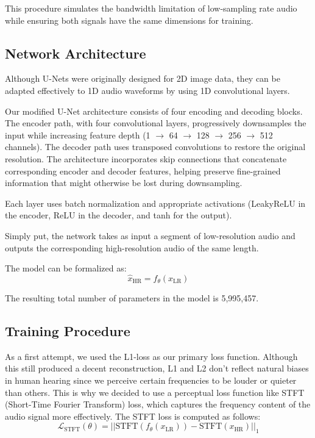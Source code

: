 \documentclass{article}
\begin{document}
This procedure simulates the bandwidth limitation of low-sampling rate audio while ensuring both signals have the same dimensions for training.

\subsection{Network Architecture}
Although U-Nets were originally designed for 2D image data, they can be adapted effectively to 1D audio waveforms by using 1D convolutional layers.

Our modified U-Net architecture consists of four encoding and decoding blocks.
The encoder path, with four convolutional layers, progressively downsamples the input while increasing feature depth (1 $\rightarrow$ 64 $\rightarrow$ 128 $\rightarrow$ 256 $\rightarrow$ 512 channels).
The decoder path uses transposed convolutions to restore the original resolution.
The architecture incorporates skip connections that concatenate corresponding encoder and decoder features, helping preserve fine-grained information that might otherwise be lost during downsampling.

Each layer uses batch normalization and appropriate activations (LeakyReLU in the encoder, ReLU in the decoder, and tanh for the output).

Simply put, the network takes as input a segment of low-resolution audio and outputs the corresponding high-resolution audio of the same length.

The model can be formalized as:
\begin{equation}
\hat{x}_{\text{HR}} = f_\theta(x_{\text{LR}})
\end{equation}

The resulting total number of parameters in the model is 5,995,457.

\subsection{Training Procedure}
As a first attempt, we used the L1-loss as our primary loss function.
Although this still produced a decent reconstruction, L1 and L2 don't reflect natural biases in human hearing since we perceive certain frequencies to be louder or quieter than others.
This is why we decided to use a perceptual loss function like STFT (Short-Time Fourier Transform) loss, which captures the frequency content of the audio signal more effectively.
The STFT loss is computed as follows:
\begin{equation}
\mathcal{L}_{\text{STFT}}(\theta) = ||\text{STFT}(f_\theta(x_{\text{LR}})) - \text{STFT}(x_{\text{HR}})||_1
\end{equation}
\end{document}
